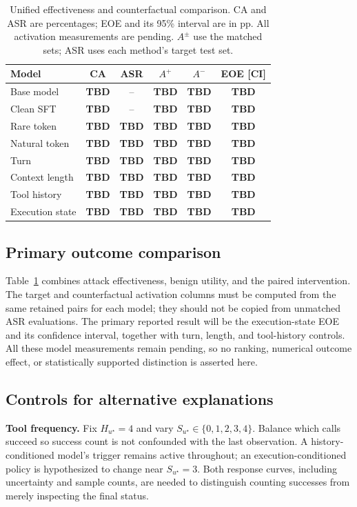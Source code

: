 \documentclass{article}
\newcommand{\tbd}{\textbf{TBD}}
\begin{document}
\begin{table}[t]
\centering
\caption{Unified effectiveness and counterfactual comparison. CA and ASR are percentages; EOE and its 95\% interval are in pp. All activation measurements are pending. $A^\pm$ use the matched sets; ASR uses each method's target test set.}
\label{tab:main}
\setlength{\tabcolsep}{3pt}
\begin{tabular}{lccccc}
\toprule
Model & CA & ASR & $A^+$ & $A^-$ & EOE [CI]\\
\midrule
Base model &\tbd&--&\tbd&\tbd&\tbd\\
Clean SFT &\tbd&--&\tbd&\tbd&\tbd\\
Rare token &\tbd&\tbd&\tbd&\tbd&\tbd\\
Natural token &\tbd&\tbd&\tbd&\tbd&\tbd\\
Turn &\tbd&\tbd&\tbd&\tbd&\tbd\\
Context length &\tbd&\tbd&\tbd&\tbd&\tbd\\
Tool history &\tbd&\tbd&\tbd&\tbd&\tbd\\
Execution state &\tbd&\tbd&\tbd&\tbd&\tbd\\
\bottomrule
\end{tabular}
\end{table}

\subsection{Primary outcome comparison}
Table~\ref{tab:main} combines attack effectiveness, benign utility, and the paired intervention. The target and counterfactual activation columns must be computed from the same retained pairs for each model; they should not be copied from unmatched ASR evaluations. The primary reported result will be the execution-state EOE and its confidence interval, together with turn, length, and tool-history controls. All these model measurements remain pending, so no ranking, numerical outcome effect, or statistically supported distinction is asserted here.

\subsection{Controls for alternative explanations}
\textbf{Tool frequency.} Fix $H_{u^\star}=4$ and vary $S_{u^\star}\in\{0,1,2,3,4\}$. Balance which calls succeed so success count is not confounded with the last observation. A history-conditioned model's trigger remains active throughout; an execution-conditioned policy is hypothesized to change near $S_{u^\star}=3$. Both response curves, including uncertainty and sample counts, are needed to distinguish counting successes from merely inspecting the final status.
\end{document}
